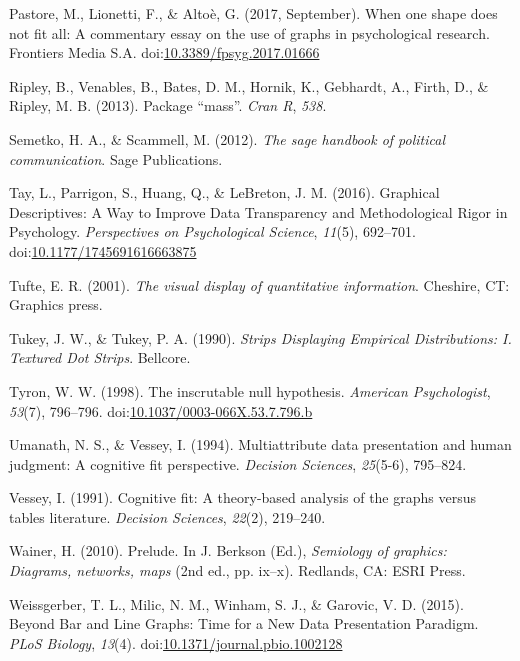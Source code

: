 \documentclass[
  man]{apa6}
\begin{document}
\leavevmode\hypertarget{ref-Pastore2017}{}%
Pastore, M., Lionetti, F., \& Altoè, G. (2017, September). When one shape does not fit all: A commentary essay on the use of graphs in psychological research. Frontiers Media S.A. doi:\href{https://doi.org/10.3389/fpsyg.2017.01666}{10.3389/fpsyg.2017.01666}

\leavevmode\hypertarget{ref-ripley2013package}{}%
Ripley, B., Venables, B., Bates, D. M., Hornik, K., Gebhardt, A., Firth, D., \& Ripley, M. B. (2013). Package ``mass''. \emph{Cran R}, \emph{538}.

\leavevmode\hypertarget{ref-semetko2012sage}{}%
Semetko, H. A., \& Scammell, M. (2012). \emph{The sage handbook of political communication}. Sage Publications.

\leavevmode\hypertarget{ref-Tay2016a}{}%
Tay, L., Parrigon, S., Huang, Q., \& LeBreton, J. M. (2016). Graphical Descriptives: A Way to Improve Data Transparency and Methodological Rigor in Psychology. \emph{Perspectives on Psychological Science}, \emph{11}(5), 692--701. doi:\href{https://doi.org/10.1177/1745691616663875}{10.1177/1745691616663875}

\leavevmode\hypertarget{ref-Tufte2001}{}%
Tufte, E. R. (2001). \emph{The visual display of quantitative information}. Cheshire, CT: Graphics press.

\leavevmode\hypertarget{ref-Tukey1990}{}%
Tukey, J. W., \& Tukey, P. A. (1990). \emph{Strips Displaying Empirical Distributions: I. Textured Dot Strips}. Bellcore.

\leavevmode\hypertarget{ref-Tyron1998}{}%
Tyron, W. W. (1998). The inscrutable null hypothesis. \emph{American Psychologist}, \emph{53}(7), 796--796. doi:\href{https://doi.org/10.1037/0003-066X.53.7.796.b}{10.1037/0003-066X.53.7.796.b}

\leavevmode\hypertarget{ref-umanath1994multiattribute}{}%
Umanath, N. S., \& Vessey, I. (1994). Multiattribute data presentation and human judgment: A cognitive fit perspective. \emph{Decision Sciences}, \emph{25}(5-6), 795--824.

\leavevmode\hypertarget{ref-vessey1991cognitive}{}%
Vessey, I. (1991). Cognitive fit: A theory-based analysis of the graphs versus tables literature. \emph{Decision Sciences}, \emph{22}(2), 219--240.

\leavevmode\hypertarget{ref-Wainer2010}{}%
Wainer, H. (2010). Prelude. In J. Berkson (Ed.), \emph{Semiology of graphics: Diagrams, networks, maps} (2nd ed., pp. ix--x). Redlands, CA: ESRI Press.

\leavevmode\hypertarget{ref-Weissgerber2015}{}%
Weissgerber, T. L., Milic, N. M., Winham, S. J., \& Garovic, V. D. (2015). Beyond Bar and Line Graphs: Time for a New Data Presentation Paradigm. \emph{PLoS Biology}, \emph{13}(4). doi:\href{https://doi.org/10.1371/journal.pbio.1002128}{10.1371/journal.pbio.1002128}
\end{document}
